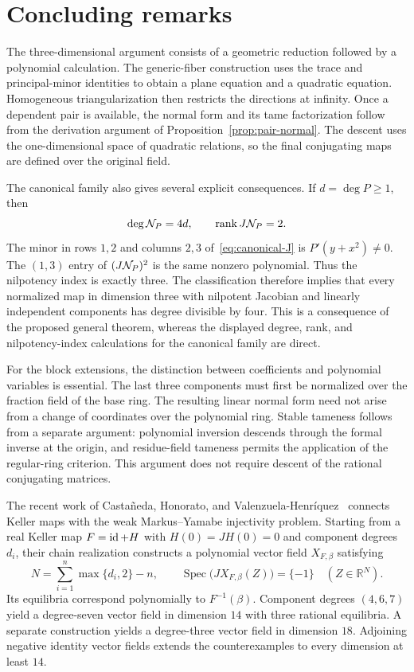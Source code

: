 \section{Concluding remarks}\label{sec:conclusion}

The three-dimensional argument consists of a geometric reduction followed by a polynomial calculation. The generic-fiber construction uses the trace and principal-minor identities to obtain a plane equation and a quadratic equation. Homogeneous triangularization then restricts the directions at infinity. Once a dependent pair is available, the normal form and its tame factorization follow from the derivation argument of Proposition~\ref{prop:pair-normal}. The descent uses the one-dimensional space of quadratic relations, so the final conjugating maps are defined over the original field.

The canonical family also gives several explicit consequences. If $d=\deg P\geq1$, then
\[
 \deg\mathcal N_P=4d,\qquad \operatorname{rank} J\mathcal N_P=2.
\]
The minor in rows $1,2$ and columns $2,3$ of~\eqref{eq:canonical-J} is $P'(y+x^2)\neq0$. The $(1,3)$ entry of $(J\mathcal N_P)^2$ is the same nonzero polynomial. Thus the nilpotency index is exactly three. The classification therefore implies that every normalized map in dimension three with nilpotent Jacobian and linearly independent components has degree divisible by four. This is a consequence of the proposed general theorem, whereas the displayed degree, rank, and nilpotency-index calculations for the canonical family are direct.

For the block extensions, the distinction between coefficients and polynomial variables is essential. The last three components must first be normalized over the fraction field of the base ring. The resulting linear normal form need not arise from a change of coordinates over the polynomial ring. Stable tameness follows from a separate argument: polynomial inversion descends through the formal inverse at the origin, and residue-field tameness permits the application of the regular-ring criterion. This argument does not require descent of the rational conjugating matrices.

The recent work of Casta{\~n}eda, Honorato, and Valenzuela-Henr{\'i}quez~\cite[Theorems~1.2, 5.1, and~8.1]{CHV2026} connects Keller maps with the weak Markus--Yamabe injectivity problem. Starting from a real Keller map $F=\operatorname{id}+H$ with $H(0)=JH(0)=0$ and component degrees $d_i$, their chain realization constructs a polynomial vector field $X_{F,\beta}$ satisfying
\[
 N=\sum_{i=1}^{n}\max\{d_i,2\}-n,
 \qquad
 \operatorname{Spec}\bigl(JX_{F,\beta}(Z)\bigr)=\{-1\}
 \quad (Z\in\mathbb R^N).
\]
Its equilibria correspond polynomially to $F^{-1}(\beta)$. Component degrees $(4,6,7)$ yield a degree-seven vector field in dimension $14$ with three rational equilibria. A separate construction yields a degree-three vector field in dimension $18$. Adjoining negative identity vector fields extends the counterexamples to every dimension at least $14$.

